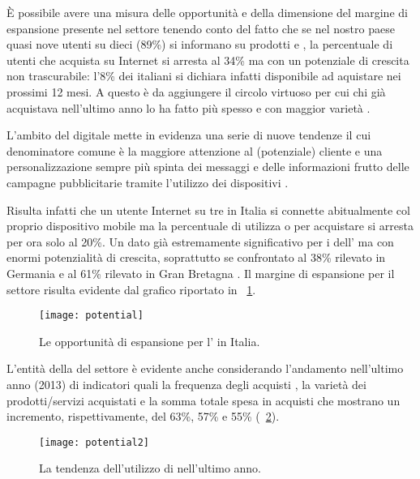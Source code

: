 È possibile avere una misura delle opportunità e della dimensione del margine di espansione presente nel settore tenendo conto del fatto che se nel nostro paese quasi nove utenti su dieci (89\%) si informano  su prodotti e , la percentuale di utenti che acquista su Internet si  arresta al 34\% ma con un potenziale di crescita non trascurabile: l'8\% dei  italiani si dichiara infatti disponibile ad aquistare  nei prossimi 12 mesi. A questo è da aggiungere il circolo virtuoso per
cui chi già acquistava nell’ultimo anno lo ha fatto più spesso e con maggior varietà \cite[\textit{pag.~3}]{contactlab:ecommerce}.

L'ambito del \mktg digitale mette in evidenza una serie di nuove tendenze il cui denominatore comune è la maggiore attenzione al (potenziale) cliente e una personalizzazione sempre più spinta dei messaggi e delle informazioni frutto delle campagne pubblicitarie tramite l'utilizzo dei dispositivi .

Risulta infatti che un utente Internet su tre in Italia si connette abitualmente col proprio dispositivo mobile ma la percentuale di utilizza  o  per acquistare  si arresta per ora solo al 20\%. Un dato già estremamente significativo per i  dell' ma con enormi potenzialità di crescita, soprattutto se confrontato al 38\% rilevato in Germania e al 61\% rilevato in Gran Bretagna \cite{contactlab:ecommerce}. Il margine di espansione per il settore risulta evidente dal grafico riportato in \figurename~\ref{fig:potential}.

\begin{figure}[H]
  \centering
  \caption{Le opportunità di espansione per l' in Italia.}
  \label{fig:potential}
  \texttt{[image: potential]}
\end{figure}

L'entità della  del settore è evidente anche considerando l'andamento nell'ultimo anno (2013) di indicatori quali la frequenza degli acquisti , la varietà dei prodotti/servizi acquistati e la somma totale spesa in acquisti  che mostrano un incremento, rispettivamente, del 63\%, 57\% e 55\% (\figurename~\ref{fig:potential2}).

\begin{figure}[H]
  \centering
  \texttt{[image: potential2]}
  \caption{La tendenza dell'utilizzo di  nell'ultimo anno.}
  \label{fig:potential2}
\end{figure}

